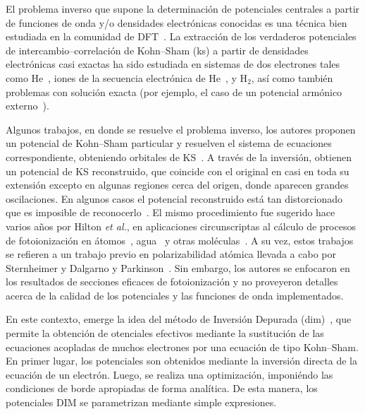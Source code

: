 El problema inverso que supone la determinación de potenciales centrales 
a partir de funciones de onda y/o densidades electrónicas conocidas es 
una técnica bien estudiada en la comunidad de 
DFT~\cite{Wu:03,Gaiduk:13,Ryabinkin:15}. La extracción de los verdaderos
potenciales de intercambio--correlación de Kohn--Sham (\ac{ks}) a partir de 
densidades electrónicas casi exactas ha sido estudiada en sistemas de 
dos electrones tales como He~\cite{Mura:97}, iones de la secuencia 
electrónica de He~\cite{Umrigar:94}, y H$_2$\cite{Gritsenko:97,Mura:97},
así como también problemas con solución exacta (por ejemplo, el caso de
un potencial armónico externo~\cite{Filippi:94}).

Algunos trabajos, en donde se resuelve el problema inverso, los autores 
proponen un potencial de Kohn--Sham particular y resuelven el sistema
de ecuaciones correspondiente, obteniendo orbitales de 
KS~\cite{Schipper:97,deSilva:12,Kananenka:13}. A través de la inversión,
obtienen un potencial de KS reconstruido, que coincide con el original
en casi en toda su extensión excepto en algunas regiones cerca del 
origen, donde aparecen grandes oscilaciones. En algunos casos el 
potencial reconstruido está tan distorcionado que es imposible de 
reconocerlo~\cite{Mura:97,Jacob:11}. El mismo procedimiento fue 
sugerido hace varios años por Hilton \textit{et al.}, en aplicaciones
circunscriptas al cálculo de procesos de fotoionización en 
átomos~\cite{Hilton:77,Suzer:77}, agua~\cite{Hilton:79} y otras 
moléculas~\cite{Hilton:80,Crljen:87}. A su vez, estos trabajos se 
refieren a un trabajo previo en polarizabilidad atómica llevada a cabo 
por Sternheimer\cite{Sternheimer:54} y Dalgarno y 
Parkinson~\cite{Dalgarno:59}. Sin embargo, los autores se enfocaron en 
los resultados de secciones eficaces de fotoionización y no proveyeron 
detalles acerca de la calidad de los potenciales y las funciones de 
onda implementados.

En este contexto, emerge la idea del método de Inversión Depurada 
(\acs{dim})~\cite{Mendez:16,Mendez:18}, que permite la obtención de 
otenciales efectivos mediante la sustitución de las ecuaciones acopladas 
de muchos electrones por una ecuación de tipo Kohn--Sham. En primer 
lugar, los potenciales son obtenidos mediante la inversión directa de 
la ecuación de un electrón. Luego, se realiza una optimización, 
imponiéndo las condiciones de borde apropiadas de forma analítica. De 
esta manera, los potenciales DIM se parametrizan mediante simple 
expresiones.

